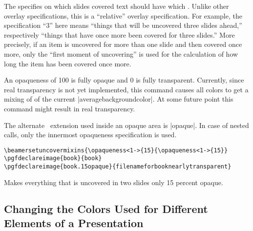 \begin{command}{\opaqueness{}}
  The  specifies on which slides covered
  text should have which . Unlike
  other overlay specifications, this  is a
  ``relative'' overlay specification. For example, the specification
  ``3'' here means ``things that will be uncovered three slides
  ahead,'' respectively ``things that have once more been covered for
  three slides.'' More precisely, if an item is uncovered for more
  than one slide and then covered once more, only the ``first moment
  of uncovering'' is used for the calculation of how long the item has
  been covered once more.

  An opaqueness of 100 is fully opaque and 0 is fully
  transparent. Currently, since real transparency is not yet
  implemented, this command causes all colors to get a mixing of
   of the current
  |averagebackgroundcolor|. At some future point this command might
  result in real transparency.

  The alternate \pgf\ extension used inside an opaque area is
  |opaque|. In case of nested calls,
  only the innermost opaqueness specification is used. 
  \example
\begin{verbatim}
\beamersetuncovermixins{\opaqueness<1->{15}{\opaqueness<1->{15}}
\pgfdeclareimage{book}{book}
\pgfdeclareimage{book.15opaque}{filenameforbooknearlytransparent}
\end{verbatim}
  Makes everything that is uncovered in two slides only 15 percent
  opaque. 
\end{command}



\subsection{Changing the Colors Used for Different Elements of a Presentation}





